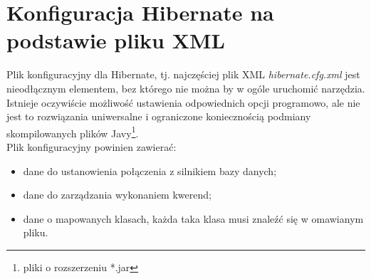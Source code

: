 \chapter{Konfiguracja Hibernate na podstawie pliku XML}
\label{ca:hibernatecfg}

Plik konfiguracyjny dla Hibernate, tj. najczęściej plik XML \textit{hibernate.cfg.xml}
jest nieodłącznym elementem, bez którego nie można by w ogóle uruchomić narzędzia. 
Istnieje oczywiście możliwość ustawienia odpowiednich opcji programowo, ale 
nie jest to rozwiązania uniwersalne i ograniczone koniecznością podmiany
skompilowanych plików Javy\footnote{pliki o rozszerzeniu *.jar}. \\
Plik konfiguracyjny powinien zawierać:
\begin{itemize}
	\item dane do ustanowienia połączenia z silnikiem bazy danych;
	\item dane do zarządzania wykonaniem kwerend;
	\item dane o mapowanych klasach, każda taka klasa musi znaleźć się w omawianym pliku.
\end{itemize}

